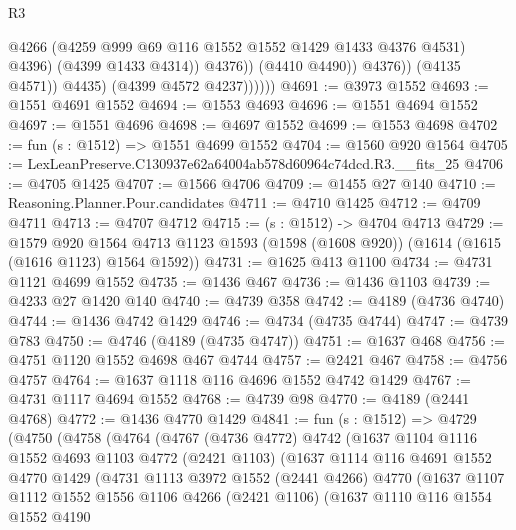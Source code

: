 \begin{lexlean}{R3}
\begin{coremodule}
                                @4266
                                (@4259 @999 @69 @116 @1552 @1552 @1429 @1433 @4376 @4531)
                                @4396)
                              (@4399 @1433 @4314))
                            @4376))
                        (@4410 @4490))
                      @4376))
                  (@4135 @4571))
                @4435)
              (@4399 @4572 @4237))))))
@4691 := @3973 @1552
@4693 := @1551 @4691 @1552
@4694 := @1553 @4693
@4696 := @1551 @4694 @1552
@4697 := @1551 @4696
@4698 := @4697 @1552
@4699 := @1553 @4698
@4702 := fun (s : @1512) => @1551 @4699 @1552
@4704 := @1560 @920 @1564
@4705 := LexLeanPreserve.C130937e62a64004ab578d60964c74dcd.R3.__fits_25
@4706 := @4705 @1425
@4707 := @1566 @4706
@4709 := @1455 @27 @140
@4710 := Reasoning.Planner.Pour.candidates
@4711 := @4710 @1425
@4712 := @4709 @4711
@4713 := @4707 @4712
@4715 := (s : @1512) -> @4704 @4713
@4729 := @1579
    @920
    @1564
    @4713
    @1123
    @1593
    (@1598 (@1608 @920))
    (@1614 (@1615 (@1616 @1123) @1564 @1592))
@4731 := @1625 @413 @1100
@4734 := @4731 @1121 @4699 @1552
@4735 := @1436 @467
@4736 := @1436 @1103
@4739 := @4233 @27 @1420 @140
@4740 := @4739 @358
@4742 := @4189 (@4736 @4740)
@4744 := @1436 @4742 @1429
@4746 := @4734 (@4735 @4744)
@4747 := @4739 @783
@4750 := @4746 (@4189 (@4735 @4747))
@4751 := @1637 @468
@4756 := @4751 @1120 @1552 @4698 @467 @4744
@4757 := @2421 @467
@4758 := @4756 @4757
@4764 := @1637 @1118 @116 @4696 @1552 @4742 @1429
@4767 := @4731 @1117 @4694 @1552
@4768 := @4739 @98
@4770 := @4189 (@2441 @4768)
@4772 := @1436 @4770 @1429
@4841 := fun (s : @1512) =>
  @4729
    (@4750
      (@4758
        (@4764
          (@4767
            (@4736 @4772)
            @4742
            (@1637
              @1104
              @1116
              @1552
              @4693
              @1103
              @4772
              (@2421 @1103)
              (@1637
                @1114
                @116
                @4691
                @1552
                @4770
                @1429
                (@4731
                  @1113
                  @3972
                  @1552
                  (@2441 @4266)
                  @4770
                  (@1637
                    @1107
                    @1112
                    @1552
                    @1556
                    @1106
                    @4266
                    (@2421 @1106)
                    (@1637
                      @1110
                      @116
                      @1554
                      @1552
                      @4190

\end{coremodule}
\end{lexlean}
